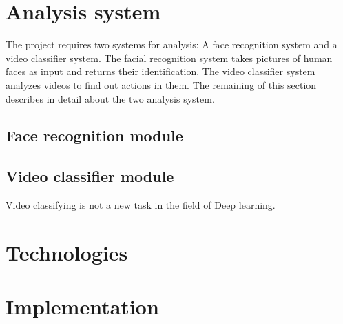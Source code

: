 \section{Analysis system}
The project requires two systems for analysis: A face recognition system and a video classifier system. The facial recognition system takes pictures of human faces as input and returns their identification. The video classifier system analyzes videos to find out actions in them. The remaining of this section describes in detail about the two analysis system.
\subsection{Face recognition module}
\subsection{Video classifier module}
Video classifying is not a new task in the field of Deep learning.
	
\section{Technologies}
\section{Implementation}